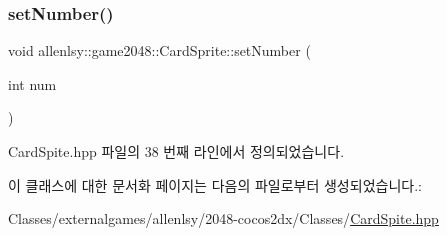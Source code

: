 \subsubsection{\texorpdfstring{set\+Number()}{setNumber()}}
{\footnotesize\ttfamily void allenlsy\+::game2048\+::\+Card\+Sprite\+::set\+Number (\begin{DoxyParamCaption}\item[{int}]{num }\end{DoxyParamCaption})\hspace{0.3cm}{\ttfamily [inline]}}



Card\+Spite.\+hpp 파일의 38 번째 라인에서 정의되었습니다.



이 클래스에 대한 문서화 페이지는 다음의 파일로부터 생성되었습니다.\+:\begin{DoxyCompactItemize}
\item 
Classes/externalgames/allenlsy/2048-\/cocos2dx/\+Classes/\hyperlink{_card_spite_8hpp}{Card\+Spite.\+hpp}\end{DoxyCompactItemize}
